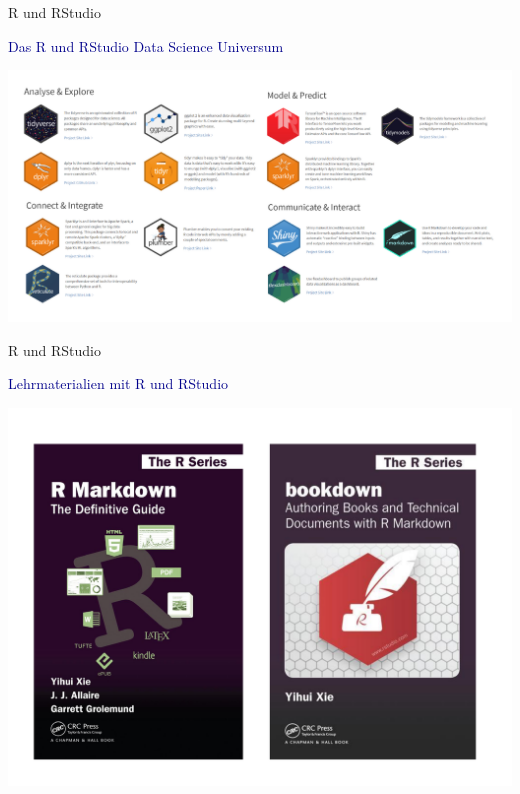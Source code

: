 \documentclass[
  8pt,
  ignorenonframetext,
]{beamer}
\begin{document}
\begin{frame}{R und RStudio}
\protect\hypertarget{r-und-rstudio-11}{}
\large

\textcolor{darkblue}{Das R und RStudio Data Science Universum}
\vspace{2mm}

\begin{center}\includegraphics[width=1\linewidth]{2_Abbildungen/pds_2_rstudio_datascienceuniverse} \end{center}
\end{frame}

\begin{frame}{R und RStudio}
\protect\hypertarget{r-und-rstudio-12}{}
\large

\textcolor{darkblue}{Lehrmaterialien mit R und RStudio} \vspace{2mm}

\begin{center}\includegraphics[width=0.8\linewidth]{2_Abbildungen/pds_2_lehrmaterialien} \end{center}
\end{frame}
\end{document}
